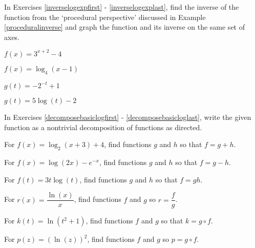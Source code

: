 \documentclass{ximera}
\begin{document}
\begin{problem}
In Exercises \ref{inverselogexpfirst} - \ref{inverselogexplast},  find the inverse of the function from the `procedural perspective' discussed in Example \ref{proceduralinverse} and graph the function and its inverse on the same set of axes.

\begin{question}\label{inverselogexpfirst}
$f(x) = 3^{x + 2} - 4$
\end{question}

\begin{question}
$f(x) = \log_{4}(x - 1)$
\end{question}

\begin{question}
$g(t)= -2^{-t} + 1$
\end{question}

\begin{question}\label{inverselogexplast}
$g(t) = 5\log(t) - 2$ 
\end{question}

\end{problem}
\begin{problem}
In Exercises \ref{decomposebasiclogfirst} - \ref{decomposebasicloglast}, write the given function as a nontrivial decomposition of functions as directed.

\begin{question}\label{decomposebasiclogfirst}
For $f(x) = \log_{2}(x+3) + 4$, find functions $g$ and $h$ so that $f=g+h$. 
\end{question}

\begin{question}
For $f(x) = \log(2x) - e^{-x}$, find functions $g$ and $h$ so that $f=g-h$. 
\end{question}

\begin{question}
For $f(t) = 3t \log(t)$, find functions $g$ and $h$ so that $f=gh$.
\end{question}

\begin{question}
For $r(x) = \dfrac{\ln(x)}{x}$, find functions $f$ and $g$ so $r = \dfrac{f}{g}$.
\end{question}

\begin{question}
For $k(t) = \ln(t^2+1)$, find functions $f$ and $g$  so that $k = g \circ f$.
\end{question}

\begin{question}\label{decomposebasicloglast}
For $p(z) = (\ln(z))^2$, find functions $f$ and $g$ so $p = g \circ f$. 
\end{question}
\end{problem}
\end{document}
